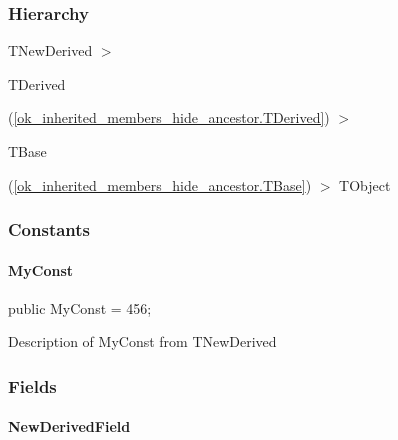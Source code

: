 \documentclass{report}
\begin{document}
\subsubsection*{\large{\textbf{Hierarchy}}\normalsize\hspace{1ex}\hfill}
TNewDerived {$>$} \begin{ttfamily}TDerived\end{ttfamily}(\ref{ok_inherited_members_hide_ancestor.TDerived}) {$>$} \begin{ttfamily}TBase\end{ttfamily}(\ref{ok_inherited_members_hide_ancestor.TBase}) {$>$} 
TObject
\subsubsection*{\large{\textbf{Constants}}\normalsize\hspace{1ex}\hfill}
\paragraph*{MyConst}\hspace*{\fill}

\begin{list}{}{
\setlength{\itemindent}{0cm}
\setlength{\listparindent}{0cm}
\setlength{\leftmargin}{\evensidemargin}
\addtolength{\leftmargin}{\tmplength}
\settowidth{\labelsep}{X}
\addtolength{\leftmargin}{\labelsep}
\setlength{\labelwidth}{\tmplength}
}
\begin{flushleft}
\item[\textbf{Declaration}\hfill]
\begin{ttfamily}
public MyConst = 456;\end{ttfamily}


\end{flushleft}
\par
\item[\textbf{Description}]
Description of MyConst from TNewDerived

\end{list}
\subsubsection*{\large{\textbf{Fields}}\normalsize\hspace{1ex}\hfill}
\paragraph*{NewDerivedField}\hspace*{\fill}
\end{document}
